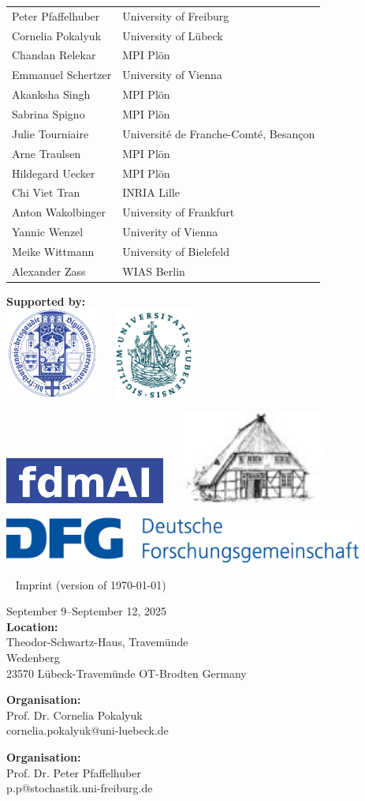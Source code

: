 \documentclass[12pt,a4paper]{article}
\makeatletter
\newcommand{\Impressum}{%
{\scriptsize
\fboxsep0pt
{\begin{minipage}[b]{.33\textwidth}
September 9--September 12, 2025\\[.5ex]
\textbf{Location: }\\
Theodor-Schwartz-Haus, Travemünde\\
Wedenberg \\
23570 Lübeck-Travemünde OT-Brodten
Germany
\end{minipage}}
\hfill
{\begin{minipage}[b]{.36\textwidth}
\textbf{Organisation: }\\
Prof. Dr. Cornelia Pokalyuk \\
cornelia.pokalyuk@uni-luebeck.de  
\end{minipage}}%
\hfill
{\begin{minipage}[b]{.28\textwidth}
\textbf{Organisation: }\\
Prof. Dr. Peter Pfaffelhuber\\
p.p@stochastik.uni-freiburg.de
\end{minipage}} 
}}
\makeatother
\begin{document}
\begin{longtable}{L{0.3\textwidth}R{0.7\textwidth}}
Peter Pfaffelhuber & University of Freiburg \\
Cornelia Pokalyuk & University of Lübeck \\
Chandan Relekar & MPI Plön \\
Emmanuel Schertzer & University of Vienna \\
Akanksha Singh & MPI Plön \\
Sabrina Spigno & MPI Plön \\
Julie Tourniaire & Université de Franche-Comté, Besançon \\
Arne Traulsen & MPI Plön \\
Hildegard Uecker & MPI Plön \\
Chi Viet Tran & INRIA Lille \\
Anton Wakolbinger & University of Frankfurt \\
Yannic Wenzel & Univerity of Vienna \\
Meike Wittmann & University of Bielefeld \\
Alexander Zass & WIAS Berlin \\
\end{longtable}


\newpage


\textbf{Supported by: }\\
 
\includegraphics[height=3cm]{UFR-vorlage-designsystem-typo-farben-V1.99-768x543.png}
~\hfill ~
\includegraphics[height=3cm]{Siegel-Uni-Luebeck.svg.png}
~\hfill ~

\bigskip
\includegraphics[height=1.5cm]{fdmai.png}
~\hfill ~
\includegraphics[height=3cm]{logo-tsh.jpg}
~\hfill ~

\bigskip
\bigskip
\bigskip
\bigskip

\includegraphics[height=1.5cm]{dfg.jpg}

 ~
 \vfill
 {\scriptsize Imprint {\tiny (version of \today) }} \\[1ex]
 \Impressum
 
 \bigskip
\end{document}
